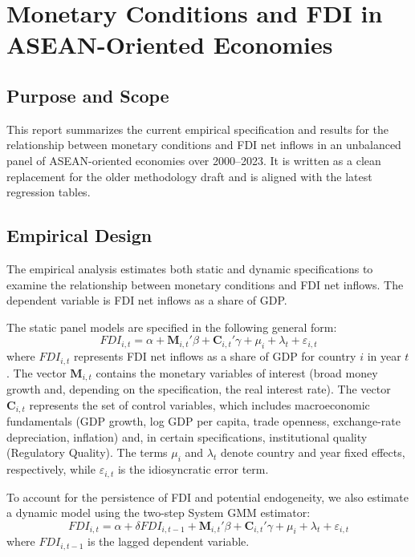 \chapter{Monetary Conditions and FDI in ASEAN-Oriented Economies}
\label{chap:fresh-monetary-fdi-report}

\section{Purpose and Scope}
\label{sec:purpose-scope}

This report summarizes the current empirical specification and results for the relationship between monetary conditions and FDI net inflows in an unbalanced panel of ASEAN-oriented economies over 2000--2023. It is written as a clean replacement for the older methodology draft and is aligned with the latest regression tables.

\section{Empirical Design}
\label{sec:empirical-design}

The empirical analysis estimates both static and dynamic specifications to examine the relationship between monetary conditions and FDI net inflows. The dependent variable is FDI net inflows as a share of GDP. 

The static panel models are specified in the following general form:
\begin{equation}
    \mathit{FDI}_{i,t} = \alpha + \mathbf{M}_{i,t}'\beta + \mathbf{C}_{i,t}'\gamma + \mu_i + \lambda_t + \varepsilon_{i,t}
    \label{eq:static}
\end{equation}
where $\mathit{FDI}_{i,t}$ represents FDI net inflows as a share of GDP for country $i$ in year $t$. The vector $\mathbf{M}_{i,t}$ contains the monetary variables of interest (broad money growth and, depending on the specification, the real interest rate). The vector $\mathbf{C}_{i,t}$ represents the set of control variables, which includes macroeconomic fundamentals (GDP growth, log GDP per capita, trade openness, exchange-rate depreciation, inflation) and, in certain specifications, institutional quality (Regulatory Quality). The terms $\mu_i$ and $\lambda_t$ denote country and year fixed effects, respectively, while $\varepsilon_{i,t}$ is the idiosyncratic error term.

To account for the persistence of FDI and potential endogeneity, we also estimate a dynamic model using the two-step System GMM estimator:
\begin{equation}
    \mathit{FDI}_{i,t} = \alpha + \delta \mathit{FDI}_{i,t-1} + \mathbf{M}_{i,t}'\beta + \mathbf{C}_{i,t}'\gamma + \mu_i + \lambda_t + \varepsilon_{i,t}
    \label{eq:dynamic}
\end{equation}
where $\mathit{FDI}_{i,t-1}$ is the lagged dependent variable.

